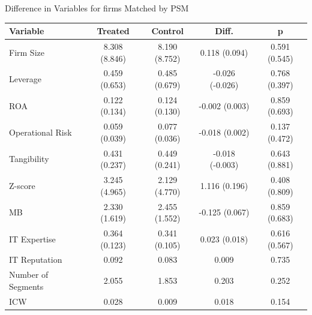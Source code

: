 \documentclass[13pt]{beamer}
\begin{document}
\begin{frame}
  {Difference in Variables for firms Matched by PSM}
  \scriptsize

  \begin{table}[ht]
    \centering
    \begin{tabular}{@{}lcccc@{}}
      \toprule
      Variable           & Treated       & Control       & Diff.           & p             \\
      \midrule
      Firm Size          & 8.308 (8.846) & 8.190 (8.752) & 0.118 (0.094)   & 0.591 (0.545) \\
      Leverage           & 0.459 (0.653) & 0.485 (0.679) & -0.026 (-0.026) & 0.768 (0.397) \\
      ROA                & 0.122 (0.134) & 0.124 (0.130) & -0.002 (0.003)  & 0.859 (0.693) \\
      Operational Risk   & 0.059 (0.039) & 0.077 (0.036) & -0.018 (0.002)  & 0.137 (0.472) \\
      Tangibility        & 0.431 (0.237) & 0.449 (0.241) & -0.018 (-0.003) & 0.643 (0.881) \\
      Z-score            & 3.245 (4.965) & 2.129 (4.770) & 1.116 (0.196)   & 0.408 (0.809) \\
      MB                 & 2.330 (1.619) & 2.455 (1.552) & -0.125 (0.067)  & 0.859 (0.683) \\
      IT Expertise       & 0.364 (0.123) & 0.341 (0.105) & 0.023 (0.018)   & 0.616 (0.567) \\
      IT Reputation      & 0.092         & 0.083         & 0.009           & 0.735         \\
      Number of Segments & 2.055         & 1.853         & 0.203           & 0.252         \\
      ICW                & 0.028         & 0.009         & 0.018           & 0.154         \\
      \bottomrule
    \end{tabular}
  \end{table}

\end{frame}
\end{document}
